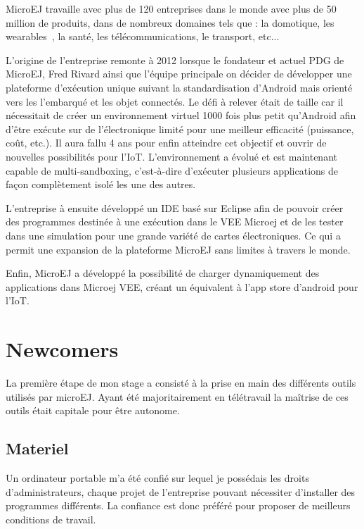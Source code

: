 \documentclass[french,a4paper,12pt]{report}
\begin{document}
MicroEJ travaille avec plus de 120 entreprises dans le monde avec plus de 50 million de produits, dans de nombreux domaines tels que : la domotique, les wearables , la santé, les télécommunications, le transport, etc...

L’origine de l’entreprise remonte à 2012 lorsque le fondateur et actuel PDG de MicroEJ, Fred Rivard ainsi que l’équipe principale on décider de développer une plateforme d’exécution unique suivant la standardisation d’Android mais orienté vers les l'embarqué et les objet connectés. Le défi à relever était de taille car il nécessitait de créer un environnement virtuel 1000 fois plus petit qu’Android afin d’être exécute sur de l’électronique limité pour une meilleur efficacité (puissance, coût, etc.). Il aura fallu 4 ans pour enfin atteindre cet objectif et ouvrir de nouvelles possibilités pour l’IoT. 
L'environnement a évolué et est maintenant capable de multi-sandboxing, c'est-à-dire d’exécuter plusieurs applications de façon complètement isolé les une des autres.


L’entreprise à ensuite développé un IDE basé sur Eclipse afin de pouvoir créer des programmes destinée à une exécution dans le VEE Microej et de les tester dans une simulation pour une grande variété de cartes électroniques. Ce qui a permit une expansion de la plateforme MicroEJ sans limites à travers le monde.

Enfin, MicroEJ a développé la possibilité de charger dynamiquement des applications dans Microej VEE, créant un équivalent à l'app store d'android pour l'IoT. 

\chapter{Newcomers}

La première étape de mon stage a consisté à la prise en main des différents outils utilisés par microEJ. Ayant été majoritairement en télétravail la maîtrise de ces outils était capitale pour être autonome.

\section{Materiel} 

Un ordinateur portable m’a été confié sur lequel je possédais les droits d’administrateurs, chaque projet de l’entreprise pouvant nécessiter d’installer des programmes différents. La confiance est donc préféré pour proposer de meilleurs conditions de travail.
\end{document}
